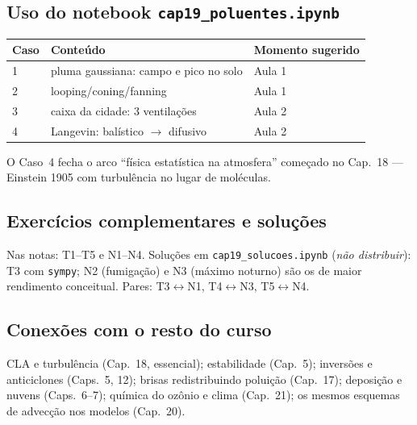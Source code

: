\subsection*{Uso do notebook \texttt{cap19\_poluentes.ipynb}}

\begin{center}
\begin{tabular}{lll}
\hline
Caso & Conteúdo & Momento sugerido \\
\hline
1 & pluma gaussiana: campo e pico no solo & Aula 1 \\
2 & looping/coning/fanning & Aula 1 \\
3 & caixa da cidade: 3 ventilações & Aula 2 \\
4 & Langevin: balístico $\to$ difusivo & Aula 2 \\
\hline
\end{tabular}
\end{center}

O Caso~4 fecha o arco ``física estatística na atmosfera'' começado no
Cap.~18 — Einstein 1905 com turbulência no lugar de moléculas.

\subsection*{Exercícios complementares e soluções}

Nas notas: T1--T5 e N1--N4. Soluções em \texttt{cap19\_solucoes.ipynb}
(\emph{não distribuir}): T3 com \texttt{sympy}; N2 (fumigação) e N3
(máximo noturno) são os de maior rendimento conceitual. Pares:
T3$\leftrightarrow$N1, T4$\leftrightarrow$N3, T5$\leftrightarrow$N4.

\subsection*{Conexões com o resto do curso}

CLA e turbulência (Cap.~18, essencial); estabilidade (Cap.~5);
inversões e anticiclones (Caps.~5, 12); brisas redistribuindo poluição
(Cap.~17); deposição e nuvens (Caps.~6--7); química do ozônio e clima
(Cap.~21); os mesmos esquemas de advecção nos modelos (Cap.~20).
